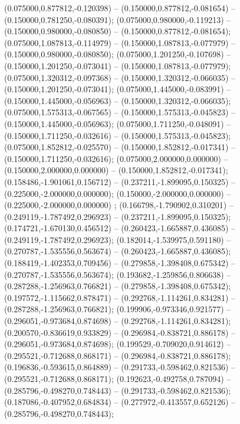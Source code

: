  (0.075000,0.877812,-0.120398) -- (0.150000,0.877812,-0.081654) -- (0.150000,0.781250,-0.080391);
 (0.075000,0.980000,-0.119213) -- (0.150000,0.980000,-0.080850) -- (0.150000,0.877812,-0.081654);
 (0.075000,1.087813,-0.114979) -- (0.150000,1.087813,-0.077979) -- (0.150000,0.980000,-0.080850);
 (0.075000,1.201250,-0.107698) -- (0.150000,1.201250,-0.073041) -- (0.150000,1.087813,-0.077979);
 (0.075000,1.320312,-0.097368) -- (0.150000,1.320312,-0.066035) -- (0.150000,1.201250,-0.073041);
 (0.075000,1.445000,-0.083991) -- (0.150000,1.445000,-0.056963) -- (0.150000,1.320312,-0.066035);
 (0.075000,1.575313,-0.067565) -- (0.150000,1.575313,-0.045823) -- (0.150000,1.445000,-0.056963);
 (0.075000,1.711250,-0.048091) -- (0.150000,1.711250,-0.032616) -- (0.150000,1.575313,-0.045823);
 (0.075000,1.852812,-0.025570) -- (0.150000,1.852812,-0.017341) -- (0.150000,1.711250,-0.032616);
 (0.075000,2.000000,0.000000) -- (0.150000,2.000000,0.000000) -- (0.150000,1.852812,-0.017341);
 (0.158486,-1.901061,0.156712) -- (0.237211,-1.899095,0.150325) -- (0.225000,-2.000000,0.000000);
 (0.150000,-2.000000,0.000000) -- (0.225000,-2.000000,0.000000) ;
 (0.166798,-1.790902,0.310201) -- (0.249119,-1.787492,0.296923) -- (0.237211,-1.899095,0.150325);
 (0.174721,-1.670130,0.456512) -- (0.260423,-1.665887,0.436085) -- (0.249119,-1.787492,0.296923);
 (0.182014,-1.539975,0.591180) -- (0.270787,-1.535556,0.563674) -- (0.260423,-1.665887,0.436085);
 (0.188419,-1.402353,0.709456) -- (0.279858,-1.398408,0.675342) -- (0.270787,-1.535556,0.563674);
 (0.193682,-1.259856,0.806638) -- (0.287288,-1.256963,0.766821) -- (0.279858,-1.398408,0.675342);
 (0.197572,-1.115662,0.878471) -- (0.292768,-1.114261,0.834281) -- (0.287288,-1.256963,0.766821);
 (0.199906,-0.973346,0.921577) -- (0.296051,-0.973684,0.874698) -- (0.292768,-1.114261,0.834281);
 (0.200570,-0.836619,0.933829) -- (0.296984,-0.838721,0.886178) -- (0.296051,-0.973684,0.874698);
 (0.199529,-0.709020,0.914612) -- (0.295521,-0.712688,0.868171) -- (0.296984,-0.838721,0.886178);
 (0.196836,-0.593615,0.864889) -- (0.291733,-0.598462,0.821536) -- (0.295521,-0.712688,0.868171);
 (0.192623,-0.492758,0.787094) -- (0.285796,-0.498270,0.748443) -- (0.291733,-0.598462,0.821536);
 (0.187086,-0.407952,0.684834) -- (0.277972,-0.413557,0.652126) -- (0.285796,-0.498270,0.748443);
